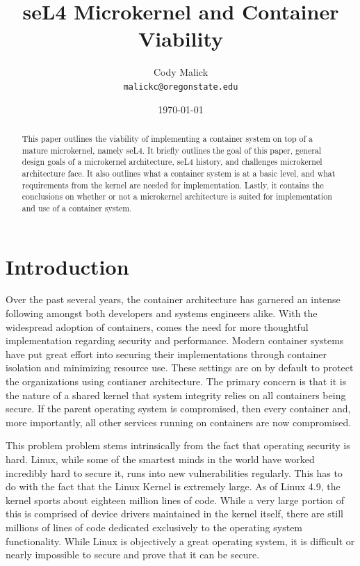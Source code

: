 \documentclass[10pt]{article}
\begin{document}
\title{seL4 Microkernel and Container Viability}
\author{Cody Malick\\
\texttt{malickc@oregonstate.edu}}
\date{\today}
\maketitle
\vspace{4cm}

\begin{abstract}
	This paper outlines the viability of implementing a container system on top of a mature microkernel, namely seL4.
	It briefly outlines the goal of this paper,	general design goals of a microkernel architecture, seL4 history, and
	challenges microkernel architecture face. It also outlines what a container system is at a basic level, and what
	requirements from the kernel are needed for implementation.	Lastly, it contains the conclusions on whether or not a
	microkernel architecture is suited for implementation and use of a container system.

\end{abstract}

\clearpage
\tableofcontents
\section*{Introduction}
	Over the past several years, the container architecture has garnered an intense following amongst both developers
	and systems engineers alike. With the widespread adoption of containers, comes the need for more thoughtful
	implementation regarding security and performance. Modern container systems have put great effort into securing
	their implementations through container isolation and minimizing resource use.\cite{dockersec} These settings are on
	by default to protect the organizations using contianer architecture. The primary concern is that it is the nature
	of a shared	kernel that system integrity relies on all containers being secure. If the parent operating system is
	compromised, then every container and, more importantly, all other services running on containers are now compromised.

	This problem problem stems intrinsically from the fact that operating security is hard. Linux, while some of the
	smartest minds in the world have worked incredibly hard to secure it, runs into new vulnerabilities regularly. This
	has to do with the fact that the Linux Kernel is extremely large. As of Linux 4.9, the kernel sports about eighteen
	million lines of code.\cite{linuxcounter} While a very large portion of this is comprised of device drivers maintained
	in the kernel itself, there are still millions of lines of code dedicated exclusively to the operating system
	functionality. While Linux is objectively a great operating system, it is difficult or nearly impossible to secure
	and prove that it can be secure.
\end{document}
